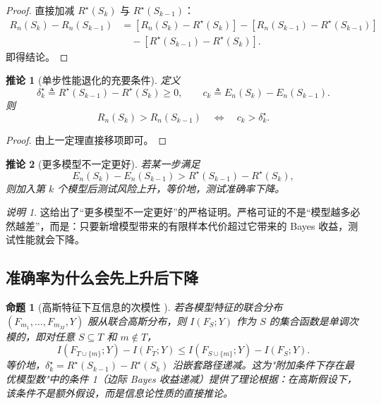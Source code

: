 \documentclass[UTF8,fontset=fandol]{ctexart}
\newtheorem{proposition}{命题}
\newtheorem{corollary}{推论}
\theoremstyle{remark}
\newtheorem{remark}{说明}
\begin{document}
\begin{proof}
直接加减 $R^\star(S_k)$ 与 $R^\star(S_{k-1})$：
\begin{align*}
R_n(S_k) - R_n(S_{k-1})
&= [R_n(S_k) - R^\star(S_k)] - [R_n(S_{k-1}) - R^\star(S_{k-1})] \\
&\quad - [R^\star(S_{k-1}) - R^\star(S_k)].
\end{align*}
即得结论。
\end{proof}

\begin{corollary}[单步性能退化的充要条件]
定义
\[
\delta_k^\star \triangleq R^\star(S_{k-1}) - R^\star(S_k) \ge 0,
\qquad
c_k \triangleq E_n(S_k) - E_n(S_{k-1}).
\]
则
\[
R_n(S_k) > R_n(S_{k-1})
\quad\Longleftrightarrow\quad
c_k > \delta_k^\star.
\]
\end{corollary}

\begin{proof}
由上一定理直接移项即可。
\end{proof}

\begin{corollary}[更多模型不一定更好]
若某一步满足
\[
E_n(S_k) - E_n(S_{k-1}) > R^\star(S_{k-1}) - R^\star(S_k),
\]
则加入第 $k$ 个模型后测试风险上升，等价地，测试准确率下降。
\end{corollary}

\begin{remark}
这给出了“更多模型不一定更好”的严格证明。严格可证的不是“模型越多必然越差”，而是：只要新增模型带来的有限样本代价超过它带来的 Bayes 收益，测试性能就会下降。
\end{remark}

\subsection{准确率为什么会先上升后下降}

\begin{proposition}[高斯特征下互信息的次模性 \cite{krause2008near}]
\label{prop:submodularity}
若各模型特征的联合分布 $(F_{m_1}, \dots, F_{m_M}, Y)$ 服从联合高斯分布，则 $I(F_S; Y)$ 作为 $S$ 的集合函数是单调次模的，即对任意 $S \subseteq T$ 和 $m \notin T$，
\[
I(F_{T \cup \{m\}}; Y) - I(F_T; Y) \le I(F_{S \cup \{m\}}; Y) - I(F_S; Y).
\]
等价地，$\delta_k^\star = R^\star(S_{k-1}) - R^\star(S_k)$ 沿嵌套路径递减。这为"附加条件下存在最优模型数"中的条件 1（边际 Bayes 收益递减）提供了理论根据：在高斯假设下，该条件不是额外假设，而是信息论性质的直接推论。
\end{proposition}
\end{document}
